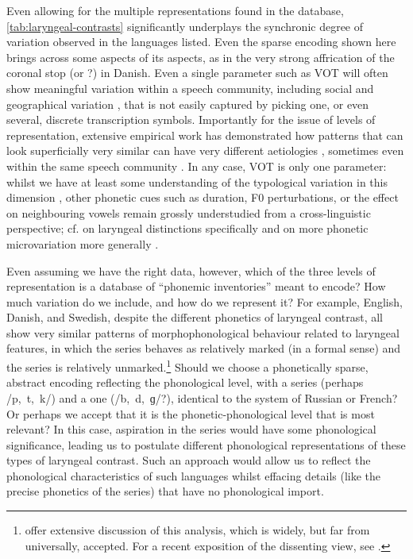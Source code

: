 \documentclass[output=paper,colorlinks,citecolor=brown]{langscibook}
\begin{document}
Even allowing for the multiple representations found in the database, \cref{tab:laryngeal-contrasts} significantly underplays the synchronic degree of variation observed in the languages listed. Even the sparse encoding shown here brings across some aspects of its aspects, as in the very strong affrication of the {\VOICELESS} coronal stop \ipa{[tʰ]} (or ?) in Danish. Even a single parameter such as VOT will often show meaningful variation within a speech community, including social and geographical variation \parencite[cf. on Danish][]{puggaard2021jutlandic}, that is not easily captured by picking one, or even several, discrete transcription symbols. Importantly for the issue of levels of representation, extensive empirical work has demonstrated how patterns that can look superficially very similar can have very different aetiologies \parencite{pierrehumbert00:_concep,scobbie07:_inter}, sometimes even within the same speech community \parencite[for examples, see][]{myers-phonoknowledge,przezdziecki05:_vowel_yorub,strycharczuk2014phonetic}. In any case, VOT is only one parameter: whilst we have at least some understanding of the typological variation in this dimension \parencite{petrova06:_voice, chodroff2019covariation}, other phonetic cues such as duration, F0 perturbations, or the effect on neighbouring vowels remain grossly understudied from a cross\hyp linguistic perspective; cf. on laryngeal distinctions specifically \textcite{kirby2019effects} and on more phonetic microvariation more generally \textcite{anderson2018, heggarty_sound_2019}.

Even assuming we have the right data, however, which of the three levels of representation is a database of \enquote{phonemic inventories} meant to encode? How much variation do we include, and how do we represent it? For example, English, Danish, and Swedish, despite the different phonetics of laryngeal contrast, all show very similar patterns of morphophonological behaviour related to laryngeal features, in which the {\VOICELESS} series behaves as relatively marked (in a formal sense) and the {\VOICED} series is relatively unmarked.\footnote{\Textcite{iverson99:_laryn_german} offer extensive discussion of this analysis, which is widely, but far from universally, accepted. For a recent exposition of the dissenting view, see \textcite{ahmed2020english}.} Should we choose a phonetically sparse, abstract encoding reflecting the phonological level, with a {\VOICELESS} series (perhaps /p,~t,~k/) and a {\VOICED} one (/b,~d,~ɡ/?), identical to the system of Russian or French? Or perhaps we accept that it is the phonetic\hyp phonological level that is most relevant? In this case, aspiration in the {\VOICELESS} series would have some phonological significance, leading us to postulate different phonological representations of these types of laryngeal contrast. Such an approach \parencite[cf.][]{salmons2017germanic}  would allow us to reflect the phonological characteristics of such languages whilst effacing details (like the precise phonetics of the {\VOICED} series) that have no phonological import.
\end{document}
